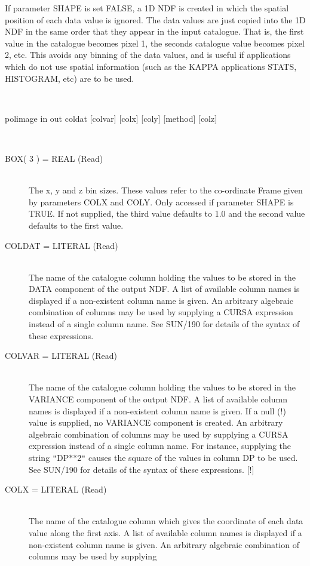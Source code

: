 \documentclass[twoside,11pt]{article}
\renewcommand{\_}{\texttt{\symbol{95}}}
\newcommand{\sstusage}[1]{\item[Usage:] \mbox{}
\\[1.3ex]{\raggedright \ssttt #1}}
\newcommand{\sstparameters}[1]{
   \item[Parameters:] \mbox{} \\
   \vspace{-3.5ex}
   \begin{description}
      #1
   \end{description}
}
\newcommand{\sstsubsection}[1]{ \item[{#1}] \mbox{} \\}
\newcommand{\sstusage}[1]{\item[Usage:]
      \begin{description}
         {\ssttt #1}
      \end{description}
      \\
   }
\newcommand{\sstparameters}[1]{
      \item[Parameters:] \\
      \begin{description}
         #1
      \end{description}
      \\
   }
\newcommand{\sstsubsection}[1]{\item[{#1}]}
\begin{document}
{{      If parameter SHAPE is set FALSE, a 1D NDF is created in which the
      spatial position of each data value is ignored. The data values are
      just copied into the 1D NDF in the same order that they appear in the
      input catalogue. That is, the first value in the catalogue becomes
      pixel 1, the seconds catalogue value becomes pixel 2, etc. This avoids
      any binning of the data values, and is useful if applications which do
      not use spatial information (such as the KAPPA applications STATS,
      HISTOGRAM, etc) are to be used.
   }
   \sstusage{
      polimage in out coldat [colvar] [colx] [coly] [method] [colz]
   }
   \sstparameters{
      \sstsubsection{
         BOX( 3 ) = \_REAL (Read)
      }{
         The x, y and z bin sizes. These values refer to the co-ordinate Frame
         given by parameters COLX and COLY. Only accessed if parameter SHAPE
         is TRUE. If not supplied, the third value defaults to 1.0 and the
         second value defaults to the first value.
      }
      \sstsubsection{
         COLDAT = LITERAL (Read)
      }{
         The name of the catalogue column holding the values to be stored
         in the DATA component of the output NDF. A list of available
         column names is displayed if a non-existent column name is given.
         An arbitrary algebraic combination of columns may be used by
         supplying a CURSA expression instead of a single column name. See
         SUN/190 for details of the syntax of these expressions.
      }
      \sstsubsection{
         COLVAR = LITERAL (Read)
      }{
         The name of the catalogue column holding the values to be stored
         in the VARIANCE component of the output NDF. A list of available
         column names is displayed if a non-existent column name is given.
         If a null (!) value is supplied, no VARIANCE component is created.
         An arbitrary algebraic combination of columns may be used by
         supplying a CURSA expression instead of a single column name.
         For instance, supplying the string {\tt "}DP$*$$*$2{\tt "} causes the square of
         the values in column DP to be used. See SUN/190 for details of the
         syntax of these expressions. [!]
      }
      \sstsubsection{
         COLX = LITERAL (Read)
      }{
         The name of the catalogue column which gives the coordinate
         of each data value along the first axis. A list of available column
         names is displayed if a non-existent column name is given. An
         arbitrary algebraic combination of columns may be used by supplying
}}}
\end{document}
